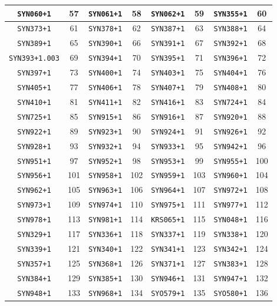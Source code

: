 \documentclass[./main.tex]{subfiles}
\begin{document}
\begin{figure}[h]
{\begin{table}
\begin{tabular}{|c|c|c|c|c|c|c|c|}
\hline
\texttt{SYN060+1} & 57 & \texttt{SYN061+1} & 58 & \texttt{SYN062+1} & 59 & \texttt{SYN355+1} & 60\\
\hline
\texttt{SYN373+1} & 61 & \texttt{SYN378+1} & 62 & \texttt{SYN387+1} & 63 & \texttt{SYN388+1} & 64\\
\hline
\texttt{SYN389+1} & 65 & \texttt{SYN390+1} & 66 & \texttt{SYN391+1} & 67 & \texttt{SYN392+1} & 68\\
\hline
\texttt{SYN393+1.003} & 69 & \texttt{SYN394+1} & 70 & \texttt{SYN395+1} & 71 & \texttt{SYN396+1} & 72\\
\hline
\texttt{SYN397+1} & 73 & \texttt{SYN400+1} & 74 & \texttt{SYN403+1} & 75 & \texttt{SYN404+1} & 76\\
\hline
\texttt{SYN405+1} & 77 & \texttt{SYN406+1} & 78 & \texttt{SYN407+1} & 79 & \texttt{SYN408+1} & 80\\
\hline
\texttt{SYN410+1} & 81 & \texttt{SYN411+1} & 82 & \texttt{SYN416+1} & 83 & \texttt{SYN724+1} & 84\\
\hline
\texttt{SYN725+1} & 85 & \texttt{SYN915+1} & 86 & \texttt{SYN916+1} & 87 & \texttt{SYN920+1} & 88\\
\hline
\texttt{SYN922+1} & 89 & \texttt{SYN923+1} & 90 & \texttt{SYN924+1} & 91 & \texttt{SYN926+1} & 92\\
\hline
\texttt{SYN928+1} & 93 & \texttt{SYN932+1} & 94 & \texttt{SYN933+1} & 95 & \texttt{SYN942+1} & 96\\
\hline
\texttt{SYN951+1} & 97 & \texttt{SYN952+1} & 98 & \texttt{SYN953+1} & 99 & \texttt{SYN955+1} & 100\\
\hline
\texttt{SYN956+1} & 101 & \texttt{SYN958+1} & 102 & \texttt{SYN959+1} & 103 & \texttt{SYN960+1} & 104\\
\hline
\texttt{SYN962+1} & 105 & \texttt{SYN963+1} & 106 & \texttt{SYN964+1} & 107 & \texttt{SYN972+1} & 108\\
\hline
\texttt{SYN973+1} & 109 & \texttt{SYN974+1} & 110 & \texttt{SYN975+1} & 111 & \texttt{SYN977+1} & 112\\
\hline
\texttt{SYN978+1} & 113 & \texttt{SYN981+1} & 114 & \texttt{KRS065+1} & 115 & \texttt{SYN048+1} & 116\\
\hline
\texttt{SYN329+1} & 117 & \texttt{SYN336+1} & 118 & \texttt{SYN337+1} & 119 & \texttt{SYN338+1} & 120\\
\hline
\texttt{SYN339+1} & 121 & \texttt{SYN340+1} & 122 & \texttt{SYN341+1} & 123 & \texttt{SYN342+1} & 124\\
\hline
\texttt{SYN357+1} & 125 & \texttt{SYN368+1} & 126 & \texttt{SYN371+1} & 127 & \texttt{SYN383+1} & 128\\
\hline
\texttt{SYN384+1} & 129 & \texttt{SYN385+1} & 130 & \texttt{SYN946+1} & 131 & \texttt{SYN947+1} & 132\\
\hline
\texttt{SYN948+1} & 133 & \texttt{SYN968+1} & 134 & \texttt{SYO579+1} & 135 & \texttt{SYO580+1} & 136\\
\hline
\end{tabular}
\end{table}
    }
    
\end{figure}
\end{document}
